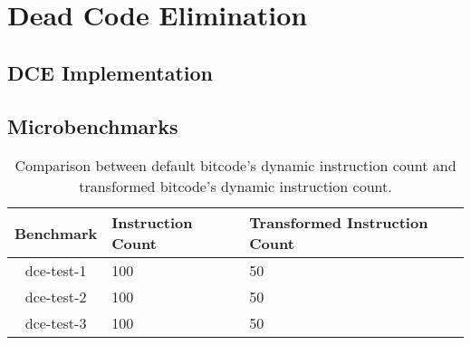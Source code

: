 \section{Dead Code Elimination}

\subsection{DCE Implementation}

\subsection{Microbenchmarks}

\begin{table}[!ht]
\centering
\begin{tabular}{c|l|l}
  \toprule
  \textbf{Benchmark} & \textbf{Instruction Count} & \textbf{Transformed Instruction Count} \\
  \midrule
  dce-test-1 & 100 & 50 \\ 
  dce-test-2 & 100 & 50 \\
  dce-test-3 & 100 & 50 \\ 
  \bottomrule
\end{tabular}
\caption{Comparison between default bitcode's dynamic instruction count and transformed
  bitcode's dynamic instruction count.}
\end{table}  

\newpage

